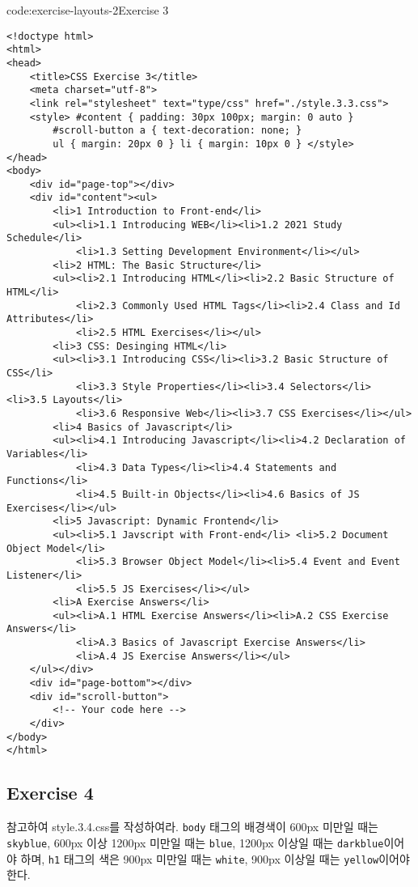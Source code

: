 \begin{codeenv}{code:exercise-layouts-2}{Exercise 3}\begin{verbatim}
<!doctype html>
<html>
<head>
    <title>CSS Exercise 3</title>
    <meta charset="utf-8">
    <link rel="stylesheet" text="type/css" href="./style.3.3.css">
    <style> #content { padding: 30px 100px; margin: 0 auto }
        #scroll-button a { text-decoration: none; }
        ul { margin: 20px 0 } li { margin: 10px 0 } </style>
</head>
<body>
    <div id="page-top"></div>
    <div id="content"><ul>
        <li>1 Introduction to Front-end</li>
        <ul><li>1.1 Introducing WEB</li><li>1.2 2021 Study Schedule</li>
            <li>1.3 Setting Development Environment</li></ul>
        <li>2 HTML: The Basic Structure</li>
        <ul><li>2.1 Introducing HTML</li><li>2.2 Basic Structure of HTML</li>
            <li>2.3 Commonly Used HTML Tags</li><li>2.4 Class and Id Attributes</li>
            <li>2.5 HTML Exercises</li></ul>
        <li>3 CSS: Desinging HTML</li>
        <ul><li>3.1 Introducing CSS</li><li>3.2 Basic Structure of CSS</li>
            <li>3.3 Style Properties</li><li>3.4 Selectors</li> <li>3.5 Layouts</li>
            <li>3.6 Responsive Web</li><li>3.7 CSS Exercises</li></ul>
        <li>4 Basics of Javascript</li>
        <ul><li>4.1 Introducing Javascript</li><li>4.2 Declaration of Variables</li>
            <li>4.3 Data Types</li><li>4.4 Statements and Functions</li>
            <li>4.5 Built-in Objects</li><li>4.6 Basics of JS Exercises</li></ul>
        <li>5 Javascript: Dynamic Frontend</li>
        <ul><li>5.1 Javscript with Front-end</li> <li>5.2 Document Object Model</li>
            <li>5.3 Browser Object Model</li><li>5.4 Event and Event Listener</li>
            <li>5.5 JS Exercises</li></ul>
        <li>A Exercise Answers</li>
        <ul><li>A.1 HTML Exercise Answers</li><li>A.2 CSS Exercise Answers</li>
            <li>A.3 Basics of Javascript Exercise Answers</li>
            <li>A.4 JS Exercise Answers</li></ul>
    </ul></div>
    <div id="page-bottom"></div>
    <div id="scroll-button">
        <!-- Your code here -->
    </div>
</body>
</html>    
\end{verbatim}
\end{codeenv}

\subsection*{Exercise 4}
\을 참고하여 style.3.4.css를 작성하여라. \texttt{body} 태그의 배경색이 600px 미만일 때는 \texttt{skyblue}, 600px 이상 1200px 미만일 때는 \texttt{blue}, 1200px 이상일 때는 \texttt{darkblue}이어야 하며, \texttt{h1} 태그의 색은 900px 미만일 때는 \texttt{white}, 900px 이상일 때는 \texttt{yellow}이어야 한다.

